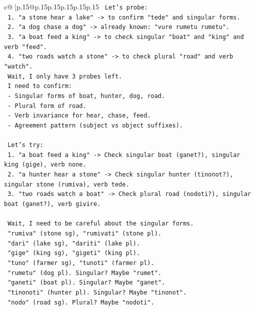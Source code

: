 \documentclass{article}
\begin{document}
{\begin{supertabular}{c@{$\;$}|p{.15\linewidth}@{}p{.15\linewidth}p{.15\linewidth}p{.15\linewidth}p{.15\linewidth}p{.15\linewidth}}
{{{\texttt{   Let's probe:} \\
\texttt{   1. "a stone hear a lake" {-}> to confirm "tede" and singular forms.} \\
\texttt{   2. "a dog chase a dog" {-}> already known: "vure rumetu rumetu".} \\
\texttt{   3. "a boat feed a king" {-}> to check singular "boat" and "king" and verb "feed".} \\
\texttt{   4. "two roads watch a stone" {-}> to check plural "road" and verb "watch".} \\
\texttt{   Wait, I only have 3 probes left.} \\
\texttt{   I need to confirm:} \\
\texttt{   {-} Singular forms of boat, hunter, dog, road.} \\
\texttt{   {-} Plural form of road.} \\
\texttt{   {-} Verb invariance for hear, chase, feed.} \\
\texttt{   {-} Agreement pattern (subject vs object suffixes).} \\
\\ 
\texttt{   Let's try:} \\
\texttt{   1. "a boat feed a king" {-}> Check singular boat (ganet?), singular king (gige), verb none.} \\
\texttt{   2. "a hunter hear a stone" {-}> Check singular hunter (tinonot?), singular stone (rumiva), verb tede.} \\
\texttt{   3. "two roads watch a boat" {-}> Check plural road (nodoti?), singular boat (ganet?), verb givire.} \\
\\ 
\texttt{   Wait, I need to be careful about the singular forms.} \\
\texttt{   "rumiva" (stone sg), "rumivati" (stone pl).} \\
\texttt{   "dari" (lake sg), "dariti" (lake pl).} \\
\texttt{   "gige" (king sg), "gigeti" (king pl).} \\
\texttt{   "tuno" (farmer sg), "tunoti" (farmer pl).} \\
\texttt{   "rumetu" (dog pl). Singular? Maybe "rumet".} \\
\texttt{   "ganeti" (boat pl). Singular? Maybe "ganet".} \\
\texttt{   "tinonoti" (hunter pl). Singular? Maybe "tinonot".} \\
\texttt{   "nodo" (road sg). Plural? Maybe "nodoti".} \\
}}}
\end{supertabular}}
\end{document}
